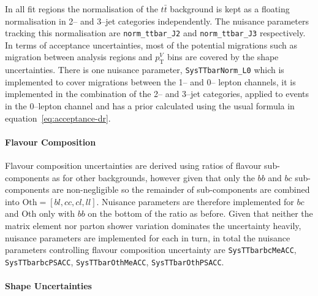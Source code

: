 In all fit regions the normalisation of the $t\bar{t}$ background is kept as a
floating normalisation in 2-- and 3--jet categories independently. The nuisance
parameters tracking this normalisation are \texttt{norm\_ttbar\_J2} and
\texttt{norm\_ttbar\_J3} respectively. In terms of acceptance uncertainties,
most of the potential migrations such as migration between analysis regions and
$p_{\mathrm{T}}^V$ bins are covered by the shape uncertainties. There is one nuisance
parameter, \texttt{SysTTbarNorm\_L0} which is implemented to cover migrations
between the 1-- and 0-- lepton channels, it is implemented in the combination of
the 2-- and 3--jet categories, applied to events in the 0--lepton channel and
has a prior calculated using the usual formula in
equation~\ref{eq:acceptance-dr}.

\paragraph{Flavour Composition}

Flavour composition uncertainties are derived using ratios of flavour
sub-components as for other backgrounds, however given that only the $bb$ and
$bc$ sub-components are non-negligible so the remainder of sub-components are
combined into $\text{Oth} = [bl, cc, cl, ll]$. Nuisance parameters are therefore
implemented for $bc$ and Oth only with $bb$ on the bottom of the ratio as
before. Given that neither the matrix element nor parton shower variation
dominates the uncertainty heavily, nuisance parameters are implemented for each
in turn, in total the nuisance parameters controlling flavour composition
uncertainty are \texttt{SysTTbarbcMeACC}, \texttt{SysTTbarbcPSACC},
\texttt{SysTTbarOthMeACC}, \texttt{SysTTbarOthPSACC}.

\paragraph{Shape Uncertainties}

